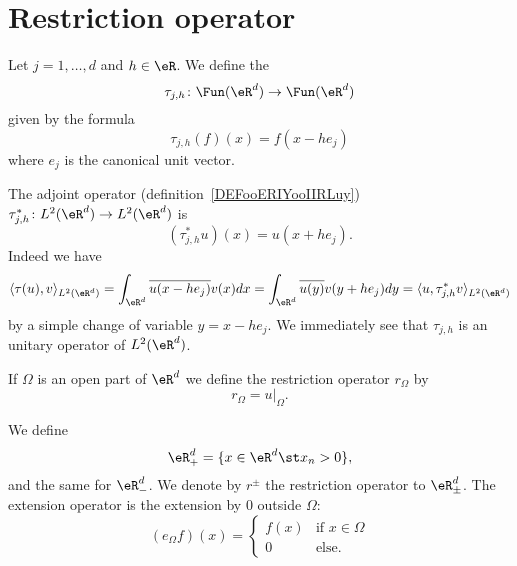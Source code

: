 \section{Restriction operator}

\begin{definition}
	Let \( j=1,\ldots, d\) and \( h\in \eR\). We define the 
	\begin{equation}
		\tau_{j,h}\colon \Fun(\eR^d)\to \Fun(\eR^d)
	\end{equation}
	given by the formula
	\begin{equation}
		\tau_{j,h}(f)(x)=f(x-h e_j)
	\end{equation}
	where \( e_j\) is the canonical unit vector.
\end{definition}

The adjoint operator (definition~\ref{DEFooERIYooIIRLuy}) \( \tau^*_{j,h}\colon L^2(\eR^d)\to L^2(\eR^d)\) is
\begin{equation}
	(\tau^*_{j,h}u)(x)=u(x+he_j).
\end{equation}
Indeed we have
\begin{equation}
	\langle \tau(u), v\rangle_{L^2(\eR^d)}=\int_{\eR^d}\overline{ u(x-he_j) }v(x)dx=\int_{\eR^d}\overline{ u(y) }v(y+he_j)dy=\langle u, \tau^*_{j,h}v\rangle_{L^2(\eR^d)}
\end{equation}
by a simple change of variable \( y=x-he_j\). We immediately see that \( \tau_{j,h}\) is an unitary operator of \( L^2(\eR^d)\).

If \( \Omega\) is an open part of \( \eR^d\) we define the restriction operator \( r_{\Omega}\) by
\begin{equation}
	r_{\Omega}=u|_{\Omega}.
\end{equation}

We define
\begin{equation}
	\eR^d_{+}=\{ x\in \eR^d\st x_n>0 \},
\end{equation}
and the same for \( \eR^d_-\). We denote by \( r^{\pm}\) the restriction operator to \( \eR^d_{\pm}\). The extension operator is the extension by \( 0\) outside \( \Omega\):
\begin{equation}
	(e_{\Omega}f)(x)=\begin{cases}
		f(x) & \text{if } x\in \Omega \\
		0    & \text{else. }
	\end{cases}
\end{equation}

